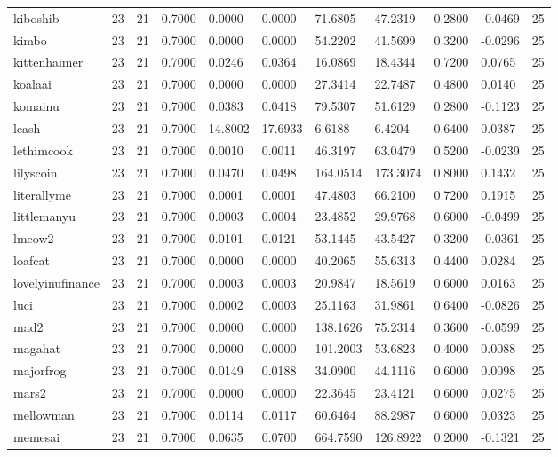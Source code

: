 \begin{table}[htbp]
\begin{tabular}{lllllllllll}
kiboshib & 23 & 21 & 0.7000 & 0.0000 & 0.0000 & 71.6805 & 47.2319 & 0.2800 & -0.0469 & 25 \\
kimbo & 23 & 21 & 0.7000 & 0.0000 & 0.0000 & 54.2202 & 41.5699 & 0.3200 & -0.0296 & 25 \\
kittenhaimer & 23 & 21 & 0.7000 & 0.0246 & 0.0364 & 16.0869 & 18.4344 & 0.7200 & 0.0765 & 25 \\
koalaai & 23 & 21 & 0.7000 & 0.0000 & 0.0000 & 27.3414 & 22.7487 & 0.4800 & 0.0140 & 25 \\
komainu & 23 & 21 & 0.7000 & 0.0383 & 0.0418 & 79.5307 & 51.6129 & 0.2800 & -0.1123 & 25 \\
leash & 23 & 21 & 0.7000 & 14.8002 & 17.6933 & 6.6188 & 6.4204 & 0.6400 & 0.0387 & 25 \\
lethimcook & 23 & 21 & 0.7000 & 0.0010 & 0.0011 & 46.3197 & 63.0479 & 0.5200 & -0.0239 & 25 \\
lilyscoin & 23 & 21 & 0.7000 & 0.0470 & 0.0498 & 164.0514 & 173.3074 & 0.8000 & 0.1432 & 25 \\
literallyme & 23 & 21 & 0.7000 & 0.0001 & 0.0001 & 47.4803 & 66.2100 & 0.7200 & 0.1915 & 25 \\
littlemanyu & 23 & 21 & 0.7000 & 0.0003 & 0.0004 & 23.4852 & 29.9768 & 0.6000 & -0.0499 & 25 \\
lmeow2 & 23 & 21 & 0.7000 & 0.0101 & 0.0121 & 53.1445 & 43.5427 & 0.3200 & -0.0361 & 25 \\
loafcat & 23 & 21 & 0.7000 & 0.0000 & 0.0000 & 40.2065 & 55.6313 & 0.4400 & 0.0284 & 25 \\
lovelyinufinance & 23 & 21 & 0.7000 & 0.0003 & 0.0003 & 20.9847 & 18.5619 & 0.6000 & 0.0163 & 25 \\
luci & 23 & 21 & 0.7000 & 0.0002 & 0.0003 & 25.1163 & 31.9861 & 0.6400 & -0.0826 & 25 \\
mad2 & 23 & 21 & 0.7000 & 0.0000 & 0.0000 & 138.1626 & 75.2314 & 0.3600 & -0.0599 & 25 \\
magahat & 23 & 21 & 0.7000 & 0.0000 & 0.0000 & 101.2003 & 53.6823 & 0.4000 & 0.0088 & 25 \\
majorfrog & 23 & 21 & 0.7000 & 0.0149 & 0.0188 & 34.0900 & 44.1116 & 0.6000 & 0.0098 & 25 \\
mars2 & 23 & 21 & 0.7000 & 0.0000 & 0.0000 & 22.3645 & 23.4121 & 0.6000 & 0.0275 & 25 \\
mellowman & 23 & 21 & 0.7000 & 0.0114 & 0.0117 & 60.6464 & 88.2987 & 0.6000 & 0.0323 & 25 \\
memesai & 23 & 21 & 0.7000 & 0.0635 & 0.0700 & 664.7590 & 126.8922 & 0.2000 & -0.1321 & 25 \\

\end{tabular}
\end{table}
